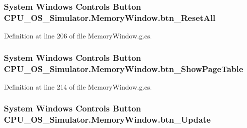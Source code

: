\subsubsection[{btn\+\_\+\+Reset\+All}]{\setlength{\rightskip}{0pt plus 5cm}System Windows Controls Button C\+P\+U\+\_\+\+O\+S\+\_\+\+Simulator.\+Memory\+Window.\+btn\+\_\+\+Reset\+All\hspace{0.3cm}{\ttfamily [package]}}\label{class_c_p_u___o_s___simulator_1_1_memory_window_aeeefcad9b4510fd7fd5899f3a2db4786}


Definition at line 206 of file Memory\+Window.\+g.\+cs.

\hypertarget{class_c_p_u___o_s___simulator_1_1_memory_window_a62372edf818561f1584160d41c2f67f7}{}
\subsubsection[{btn\+\_\+\+Show\+Page\+Table}]{\setlength{\rightskip}{0pt plus 5cm}System Windows Controls Button C\+P\+U\+\_\+\+O\+S\+\_\+\+Simulator.\+Memory\+Window.\+btn\+\_\+\+Show\+Page\+Table\hspace{0.3cm}{\ttfamily [package]}}\label{class_c_p_u___o_s___simulator_1_1_memory_window_a62372edf818561f1584160d41c2f67f7}


Definition at line 214 of file Memory\+Window.\+g.\+cs.

\hypertarget{class_c_p_u___o_s___simulator_1_1_memory_window_a9274df08bf008c43b325e50d6db6067f}{}
\subsubsection[{btn\+\_\+\+Update}]{\setlength{\rightskip}{0pt plus 5cm}System Windows Controls Button C\+P\+U\+\_\+\+O\+S\+\_\+\+Simulator.\+Memory\+Window.\+btn\+\_\+\+Update\hspace{0.3cm}{\ttfamily [package]}}\label{class_c_p_u___o_s___simulator_1_1_memory_window_a9274df08bf008c43b325e50d6db6067f}


